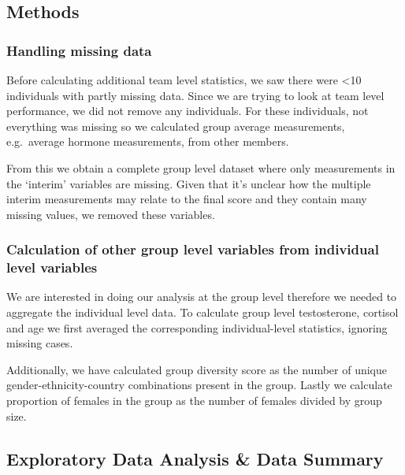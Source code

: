 \documentclass[]{article}
\begin{document}
\hypertarget{methods}{%
\subsection{Methods}\label{methods}}

\hypertarget{handling-missing-data}{%
\subsubsection{Handling missing data}\label{handling-missing-data}}

Before calculating additional team level statistics, we saw there were
\textless{}10 individuals with partly missing data. Since we are trying
to look at team level performance, we did not remove any individuals.
For these individuals, not everything was missing so we calculated group
average measurements, e.g.~average hormone measurements, from other
members.

From this we obtain a complete group level dataset where only
measurements in the `interim' variables are missing. Given that it's
unclear how the multiple interim measurements may relate to the final
score and they contain many missing values, we removed these variables.

\hypertarget{calculation-of-other-group-level-variables-from-individual-level-variables}{%
\subsubsection{Calculation of other group level variables from
individual level
variables}\label{calculation-of-other-group-level-variables-from-individual-level-variables}}

We are interested in doing our analysis at the group level therefore we
needed to aggregate the individual level data. To calculate group level
testosterone, cortisol and age we first averaged the corresponding
individual-level statistics, ignoring missing cases.

Additionally, we have calculated group diversity score as the number of
unique gender-ethnicity-country combinations present in the group.
Lastly we calculate proportion of females in the group as the number of
females divided by group size.

\hypertarget{exploratory-data-analysis-data-summary}{%
\subsection{Exploratory Data Analysis \& Data
Summary}\label{exploratory-data-analysis-data-summary}}
\end{document}
